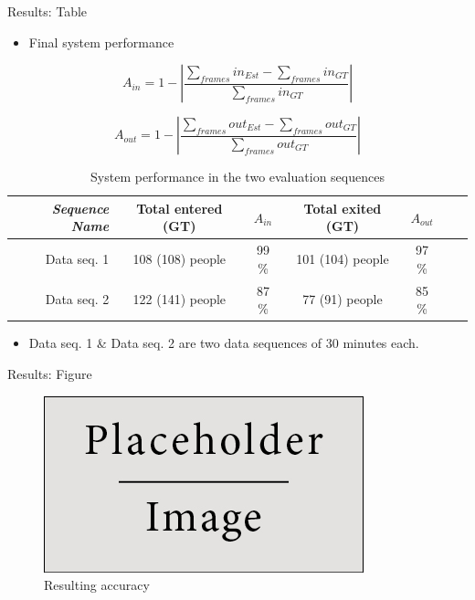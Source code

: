 \documentclass[final,hyperref={pdfpagelabels=false}]{beamer}
\begin{document}
\begin{frame}[t]
\begin{columns}[t]
\begin{column}{.465\textwidth}
\begin{block}{Results: Table}

\begin{itemize}
\item Final system performance
\end{itemize}

\begin{equation}
\label{eq:in_accuracy}
A_{in} = 1 - |\frac{\sum_{frames}{in_{Est}}-\sum_{frames}{in_{GT}}}{\sum_{frames}in_{GT}}|
\end{equation} 

\begin{equation}
\label{eq:out_accuracy}
A_{out} = 1 - |\frac{\sum_{frames}{out_{Est}}-\sum_{frames}out_{GT}}{\sum_{frames}out_{GT}}| 
\end{equation} 


\begin{table}[h]
\centering
	\begin{tabular}{r | c | c | c | c | c | c }
		\emph{Sequence Name}		&  Total entered (GT) & \emph{$A_{in}$} & Total exited (GT) & \emph{$A_{out}$} \\
		\hline \hline
		Data seq. 1			& 108 (108) people & 99 \% & 101 (104) people & 97 \% \\
		Data seq. 2			& 122 (141) people & 87 \% & 77 (91) people & 85 \%  \\
		\end{tabular}
	\caption{System performance in the two evaluation sequences}
\end{table}

\begin{itemize}
\item Data seq. 1 \& Data seq. 2 are two data sequences of 30 minutes each. 
\end{itemize}
     
\end{block}


\begin{block}{Results: Figure}

\begin{figure}
\includegraphics[width=0.8\linewidth]{placeholder.jpg}
\caption{Resulting accuracy}
\end{figure}


\end{block}
\end{column}
\end{columns}
\end{frame}
\end{document}
